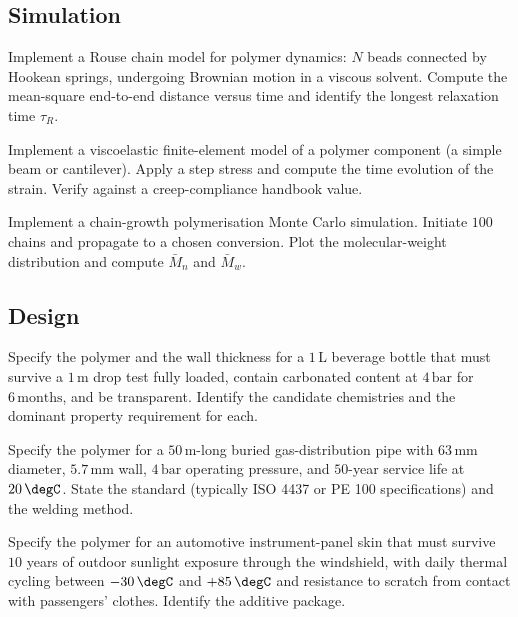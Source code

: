 \subsection*{Simulation}

\begin{exercise}
Implement a Rouse chain model for polymer dynamics: $N$ beads
connected by Hookean springs, undergoing Brownian motion in a
viscous solvent. Compute the mean-square end-to-end distance versus
time and identify the longest relaxation time $\tau_R$.
\end{exercise}

\begin{exercise}
Implement a viscoelastic finite-element model of a polymer
component (a simple beam or cantilever). Apply a step stress and
compute the time evolution of the strain. Verify against a
creep-compliance handbook value.
\end{exercise}

\begin{exercise}
Implement a chain-growth polymerisation Monte Carlo simulation.
Initiate $100$ chains and propagate to a chosen conversion. Plot the
molecular-weight distribution and compute $\bar{M}_n$ and $\bar{M}_w$.
\end{exercise}

\subsection*{Design}

\begin{exercise}
Specify the polymer and the wall thickness for a $1\,\text{L}$
beverage bottle that must survive a $1\,\text{m}$ drop test fully
loaded, contain carbonated content at $4\,\text{bar}$ for
$6\,\text{months}$, and be transparent. Identify the candidate
chemistries and the dominant property requirement for each.
\end{exercise}

\begin{exercise}
Specify the polymer for a $50\,\text{m}$-long buried gas-distribution
pipe with $63\,\text{mm}$ diameter, $5.7\,\text{mm}$ wall, $4\,\text{bar}$
operating pressure, and $50$-year service life at $20\,\degC$. State
the standard (typically ISO 4437 or PE 100 specifications) and the
welding method.
\end{exercise}

\begin{exercise}
Specify the polymer for an automotive instrument-panel skin that
must survive $10$ years of outdoor sunlight exposure through the
windshield, with daily thermal cycling between $-30\,\degC$ and
$+85\,\degC$ and resistance to scratch from contact with passengers'
clothes. Identify the additive package.
\end{exercise}

